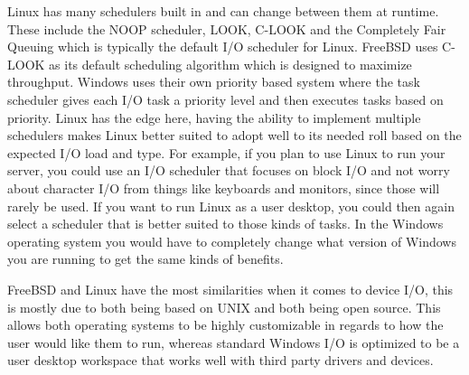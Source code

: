 \documentclass[10pt,serif,draftclsnofoot,onecolumn]{IEEEtran}
\begin{document}
	\par
			Linux has many schedulers built in and can change between them at runtime. These include the NOOP scheduler, LOOK, C-LOOK and the Completely Fair Queuing which is typically the default I/O scheduler for Linux\cite{8}. FreeBSD uses C-LOOK as its default scheduling algorithm which is designed to maximize throughput\cite{13}. Windows uses their own priority based system where the task scheduler gives each I/O task a priority level and then executes tasks based on priority. Linux has the edge here, having the ability to implement multiple schedulers makes Linux better suited to adopt well to its needed roll based on the expected I/O load and type. For example, if you plan to use Linux to run your server, you could use an I/O scheduler that focuses on block I/O and not worry about character I/O from things like keyboards and monitors, since those will rarely be used. If you want to run Linux as a user desktop, you could then again select a scheduler that is better suited to those kinds of tasks. In the Windows operating system you would have to completely change what version of Windows you are running to get the same kinds of benefits.
	\newline
	\newline
	\par
			FreeBSD and Linux have the most similarities when it comes to device I/O, this is mostly due to both being based on UNIX and both being open source. This allows both operating systems to be highly customizable in regards to how the user would like them to run, whereas standard Windows I/O is optimized to be a user desktop workspace that works well with third party drivers and devices.
	\newpage


	
	
\end{document}
